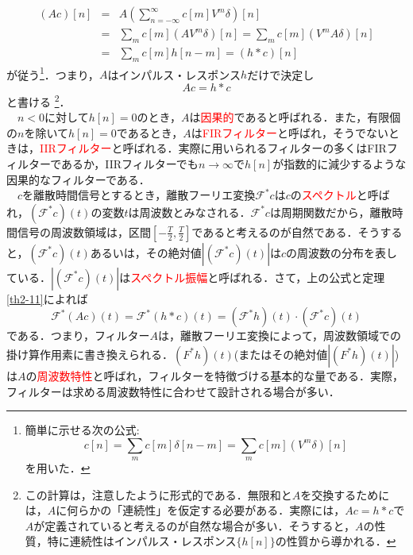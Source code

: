 \documentclass[a4j]{jsbook}
\numberwithin{theorem}{chapter}  %
\begin{document}
\begin{eqnarray*}
(Ac)[n]&=&A\left(\sum_{n=-\infty}^\infty c[m]V^m\delta\right)[n] \\
&=&\sum_m c[m](AV^m\delta)[n]=\sum_m c[m](V^mA\delta)[n] \\
&=&\sum_m c[m]h[n-m]=(h*c)[n]
\end{eqnarray*}
が従う\footnote{簡単に示せる次の公式:
\begin{equation*}
    c[n]=\sum_m c[m]\delta[n-m]=\sum_m c[m](V^m\delta)[n]
\end{equation*}
を用いた．
}．つまり，\(A\)はインパルス・レスポンス\(h\)だけで決定し
\begin{equation*}
    Ac=h*c
\end{equation*}
と書ける
\footnote{この計算は，注意したように形式的である．無限和と\(A\)を交換するためには，\(A\)に何らかの「連続性」を仮定する必要がある．実際には，\(Ac=h*c\)で\(A\)が定義されていると考えるのが自然な場合が多い．そうすると，\(A\)の性質，特に連続性はインパルス・レスポンス\(\{h[n]\}\)の性質から導かれる．
}．\\
　\(n<0\)に対して\(h[n]=0\)のとき，\(A\)は\textcolor{red}{因果的}であると呼ばれる．また，有限個の\(n\)を除いて\(h[n]=0\)であるとき，\(A\)は\textcolor{red}{FIRフィルター}と呼ばれ，そうでないときは，\textcolor{red}{IIRフィルター}と呼ばれる．実際に用いられるフィルターの多くはFIRフィルターであるか，IIRフィルターでも\(n\to\infty\)で\(h[n]\)が指数的に減少するような因果的なフィルターである．\\
　\(c\)を離散時間信号とするとき，離散フーリエ変換\(\mathcal{F}^* c\)は\(c\)の\textcolor{red}{スペクトル}と呼ばれ，\((\mathcal{F}^* c)(t)\)の変数\(t\)は周波数とみなされる．\(\mathcal{F}^* c\)は周期関数だから，離散時間信号の周波数領域は，区間\(\displaystyle\left[-\frac{T}{2}, \frac{T}{2}\right]\)であると考えるのが自然である．そうすると，\((\mathcal{F}^* c)(t)\)あるいは，その絶対値\(|(\mathcal{F}^* c)(t)|\)は\(c\)の周波数の分布を表している．\(|(\mathcal{F}^* c)(t)|\)は\textcolor{red}{スペクトル振幅}と呼ばれる．さて，上の公式と定理\ref{th2-11}によれば
\begin{equation*}
    \mathcal{F}^*(Ac)(t)=\mathcal{F}^*(h*c)(t)=(\mathcal{F}^* h)(t)\cdot(\mathcal{F}^* c)(t)
\end{equation*}
である．つまり，フィルター\(A\)は，離散フーリエ変換によって，周波数領域での掛け算作用素に書き換えられる．\((F^* h)(t)\)(またはその絶対値\(|(F^* h)(t)|\))は\(A\)の\textcolor{red}{周波数特性}と呼ばれ，フィルターを特徴づける基本的な量である．実際，フィルターは求める周波数特性に合わせて設計される場合が多い．
\end{document}
